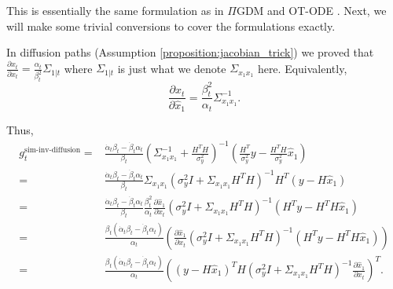 This is essentially the same formulation as in $\Pi$GDM \citep{song_pseudoinverse-guided_2022} and OT-ODE \citep{pokle_training-free_2024}. Next, we will make some trivial conversions to cover the formulations exactly. 


In diffusion paths (Assumption \ref{proposition:jacobian_trick}) we proved that $\frac{\partial\hat{x}_t}{\partial x_t} = \frac{\alpha_t}{\beta_t^2}\Sigma_{1|t}$ where $\Sigma_{1|t}$ is just what we denote $\Sigma_{x_1 x_1}$ here. Equivalently, \begin{equation}
    \frac{\partial x_t}{\partial \hat{x}_1} = \frac{\beta_t^2}{\alpha_t}\Sigma_{x_1x_1}^{-1}.
\end{equation}

Thus,
\begin{align}
    \nonumber g_t^{\text{sim-inv-diffusion}} =& \frac{\dot \alpha_t \beta_t - \dot\beta_t\alpha_t}{\beta_t} \left(
    \Sigma_{x_1 x_1}^{-1} + \frac{H^TH}{\sigma_y^2}
    \right)^{-1}
    \left(
    \frac{H^T}{\sigma_y^2}y - \frac{H^TH}{\sigma_y^2} \hat{x}_1
    \right) \\
    \nonumber =&\frac{\dot \alpha_t \beta_t - \dot\beta_t\alpha_t}{\beta_t}
    \Sigma_{x_1 x_1}
    \left(
    {\sigma_y^2}I + \Sigma_{x_1 x_1} H^TH
    \right)^{-1}
    H^T
    \left(
    y - H \hat{x}_1
    \right) \\
    \nonumber =&\frac{\dot \alpha_t \beta_t - \dot\beta_t\alpha_t}{\beta_t}
    \frac{\beta_t^2}{\alpha_t}\frac{\partial \hat{x}_1}{\partial x_t}
    \left(
        {\sigma_y^2}I + \Sigma_{x_1 x_1}H^TH 
        \right)^{-1}
        \left(
        H^T
        y - H^TH \hat{x}_1
    \right) \\
    \nonumber =&\frac{\beta_t(\dot \alpha_t \beta_t - \dot\beta_t\alpha_t)}{\alpha_t}
    \left(
        \frac{\partial \hat{x}_1}{\partial x_t}
        \left(
        {\sigma_y^2}I + \Sigma_{x_1 x_1}H^TH 
        \right)^{-1}
        \left(
        H^T
        y - H^TH \hat{x}_1
        \right)
    \right)\\
    =&\frac{\beta_t(\dot \alpha_t \beta_t - \dot\beta_t\alpha_t)}{\alpha_t}
    \left(
        \left(
        y - H \hat{x}_1
        \right)^TH
        \left(
        {\sigma_y^2}I + \Sigma_{x_1 x_1} H^T H
        \right)^{-1}
        \frac{\partial \hat{x}_1}{\partial x_t}
    \right)^T.
\end{align}


